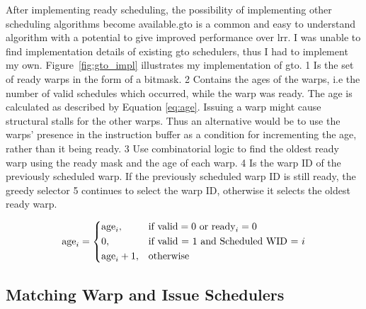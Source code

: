 After implementing ready scheduling, the possibility of implementing other scheduling algorithms become available.\Acrfull{gto} is a common and easy to understand algorithm with a potential to give improved performance over \acrfull{lrr}. I was unable to find implementation details of existing \acrshort{gto} schedulers, thus I had to implement my own. Figure~\ref{fig:gto_impl} illustrates my implementation of \acrshort{gto}. \textcircled{\small{1}} Is the set of ready warps in the form of a bitmask. \textcircled{\small{2}} Contains the ages of the warps, i.e the number of valid schedules which occurred, while the warp was ready. The age is calculated as described by Equation \ref{eq:age}. Issuing a warp might cause structural stalls for the other warps. Thus an alternative would be to use the warps' presence in the instruction buffer as a condition for incrementing the age, rather than it being ready. \textcircled{\small{3}} Use combinatorial logic to find the oldest ready warp using the ready mask and the age of each warp. \textcircled{\small{4}} Is the warp ID of the previously scheduled warp. If the previously scheduled warp ID is still ready, the greedy selector \textcircled{\small{5}} continues to select the warp ID, otherwise it selects the oldest ready warp.


\begin{equation} \label{eq:age}
    \text{age}_i = 
    \begin{dcases}
            \text{age}_i, & \text{if } \text{valid} = 0 \text{ or ready}_i = 0  \\
            0, & \text{if } \text{valid = 1 and Scheduled WID = } i \\
            \text{age}_i + 1, & \text{otherwise}
    \end{dcases}
\end{equation}

\subsection{Matching Warp and Issue Schedulers} \label{sec:warp_issue_scheduler}

